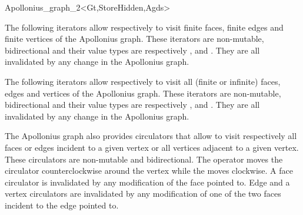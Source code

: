 \begin{ccRefClass}{Apollonius_graph_2<Gt,StoreHidden,Agds>}


The following iterators allow respectively to visit 
finite faces,  finite edges and  finite vertices
of the Apollonius graph. These iterators are non-mutable,
bidirectional and their value types are respectively
,  and . 
They are all invalidated by any change in the Apollonius graph.

\ccGlue
{}

\ccGlue
{}

\ccGlue
{}

The following iterators allow respectively to visit all
(finite or infinite) faces, edges and vertices
of the Apollonius graph. These iterators are non-mutable, bidirectional
and their value types are respectively
,  and . 
They are all invalidated by any change in the Apollonius graph.


\ccGlue
{}

\ccGlue
{}

\ccGlue
{}


\ccThreeToTwo




The Apollonius graph also provides circulators that allow to visit 
respectively all faces or edges incident to a given vertex
or all vertices adjacent to a given vertex.
These circulators are non-mutable and bidirectional.
 The operator  moves the circulator
counterclockwise around the vertex while
the  moves clockwise.
A face circulator is invalidated by any modification of the face pointed to.
Edge and a vertex circulators are invalidated by any modification
of one of the two faces incident to the edge pointed to.


\end{ccRefClass}

